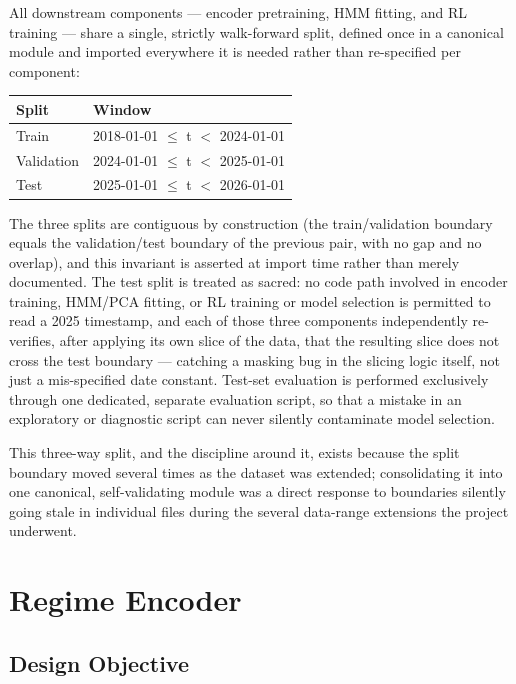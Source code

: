 All downstream components --- encoder pretraining, HMM fitting, and RL training --- share a single, strictly walk-forward split, defined once in a canonical module and imported everywhere it is needed rather than re-specified per component:

\begin{center}
\begin{tabular}{|l|l|}
\hline
\textbf{Split} & \textbf{Window} \\
\hline
Train & 2018-01-01 $\leq$ t $<$ 2024-01-01 \\
Validation & 2024-01-01 $\leq$ t $<$ 2025-01-01 \\
Test & 2025-01-01 $\leq$ t $<$ 2026-01-01 \\
\hline
\end{tabular}
\end{center}

The three splits are contiguous by construction (the train/validation boundary equals the validation/test boundary of the previous pair, with no gap and no overlap), and this invariant is asserted at import time rather than merely documented. The test split is treated as sacred: no code path involved in encoder training, HMM/PCA fitting, or RL training or model selection is permitted to read a 2025 timestamp, and each of those three components independently re-verifies, after applying its own slice of the data, that the resulting slice does not cross the test boundary --- catching a masking bug in the slicing logic itself, not just a mis-specified date constant. Test-set evaluation is performed exclusively through one dedicated, separate evaluation script, so that a mistake in an exploratory or diagnostic script can never silently contaminate model selection.

This three-way split, and the discipline around it, exists because the split boundary moved several times as the dataset was extended; consolidating it into one canonical, self-validating module was a direct response to boundaries silently going stale in individual files during the several data-range extensions the project underwent.

\section{Regime Encoder}
\label{sec:regime-encoder-methodology}

\subsection{Design Objective}
\label{subsec:encoder-objective}

